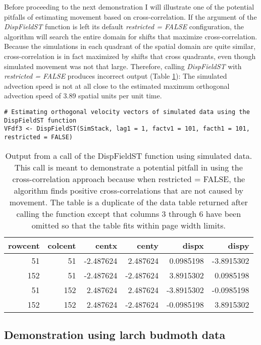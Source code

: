 Before proceeding to the next demonstration I will illustrate one of the potential pitfalls of estimating movement based on cross-correlation. If the argument of the \emph{DispFieldST} function is left its default \emph{restricted = FALSE} configuration, the algorithm will search the entire domain for shifts that maximize cross-correlation. Because the simulations in each quadrant of the spatial domain are quite similar, cross-correlation is in fact maximized by shifts that cross quadrants, even though simulated movement was not that large. Therefore, calling \emph{DispFieldST} with \emph{restricted = FALSE} produces incorrect output (Table \ref{tab:Pitfall-demo-tex}): The simulated advection speed is not at all close to the estimated maximum orthogonal advection speed of 3.89 spatial units per unit time.

\begin{verbatim}
# Estimating orthogonal velocity vectors of simulated data using the DispFieldST function
VFdf3 <- DispFieldST(SimStack, lag1 = 1, factv1 = 101, facth1 = 101, restricted = FALSE)
\end{verbatim}

\begin{table}

\caption{\label{tab:Pitfall-demo-tex}Output from a call of the DispFieldST function using simulated data. This call is meant to demonstrate a potential pitfall in using the cross-correlation approach because when restricted = FALSE, the algorithm finds positive cross-correlations that are not caused by movement. The table is a duplicate of the data table returned after calling the function except that columns 3 through 6 have been omitted so that the table fits within page width limits.}
\centering
\begin{tabular}[t]{r|r|r|r|r|r}
\hline
rowcent & colcent & centx & centy & dispx & dispy\\
\hline
51 & 51 & -2.487624 & 2.487624 & 0.0985198 & -3.8915302\\
\hline
152 & 51 & -2.487624 & -2.487624 & 3.8915302 & 0.0985198\\
\hline
51 & 152 & 2.487624 & 2.487624 & -3.8915302 & -0.0985198\\
\hline
152 & 152 & 2.487624 & -2.487624 & -0.0985198 & 3.8915302\\
\hline
\end{tabular}
\end{table}

\hypertarget{demonstration-using-larch-budmoth-data}{%
\subsection{Demonstration using larch budmoth data}\label{demonstration-using-larch-budmoth-data}}

